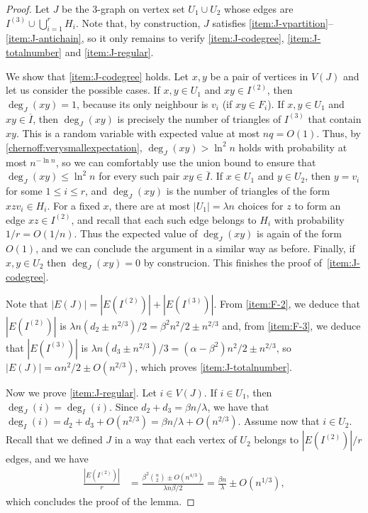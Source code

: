 \documentclass[a4paper, 11pt,reqno]{amsart}
\theoremstyle{plain}
\theoremstyle{definition}
\numberwithin{equation}{section}
\begin{document}
\begin{proof}
	Let $J$ be the $3$-graph on vertex set $U_1 \cup U_2$ whose edges
	are $I^{(3)} \cup \bigcup_{i=1}^r H_i$.  Note that, by construction,
	$J$ satisfies \ref{item:J-vpartition}--\ref{item:J-antichain}, 
	so it only remains to verify \ref{item:J-codegree},
	\ref{item:J-totalnumber} and \ref{item:J-regular}.
	
	We show that \ref{item:J-codegree} holds.  Let $x, y$ be a pair of
	vertices in $V(J)$ and let us consider the possible cases.  If $x, y
	\in U_1$ and $xy \in I^{(2)}$, then $\deg_{J}(xy) = 1$, because its only
	neighbour is $v_i$ (if $xy \in F_i$).  If $x, y \in U_1$ and $xy \in
	\overline{I}$, then $\deg_{J}(xy)$ is precisely the number of
	triangles of $I^{(3)}$ that contain $xy$. This is a random variable
	with expected value at most $nq = O(1)$.  Thus, by \ref{chernoff:verysmallexpectation}, $\deg_{J}(xy) > \ln^2 n$ holds with
	probability at most $n^{- \ln n}$, so we can comfortably use the
	union bound to ensure that $\deg_{J}(xy) \leq \ln^2 n$ for every
	such pair $xy \in \overline{I}$.  If $x \in U_1$ and $y \in U_2$,
	then $y = v_i$ for some $1 \leq i \leq r$, and $\deg_{J}(xy)$ is the
	number of triangles of the form $xzv_i \in H_i$.  For a fixed $x$,
	there are at most $|U_1| = \lambda n$ choices for $z$ to form an
	edge $xz \in I^{(2)}$, and recall that each such edge belongs to
	$H_i$ with probability $1/r = O(1/n)$.  Thus the expected value of
	$\deg_{J}(xy)$ is again of the form $O(1)$, and we can conclude the
	argument in a similar way as before. Finally, if $x, y \in U_2$ 
	then $\deg_J(xy) = 0$ by construcion.  This finishes the proof 
	of~\ref{item:J-codegree}.
	
	Note that $|E(J)| = |E(I^{(2)})|+|E(I^{(3)})|$.  From \ref{item:F-2}, we deduce  
	that $|E(I^{(2)})|$ is {$\lambda n (d_2 \pm n^{2/3})/2 = \beta^2 n^2 /2
	\pm n^{2/3}$} and, from \ref{item:F-3}, we deduce that $|E(I^{(3)})|$ is
	{$\lambda n (d_3 \pm n^{2/3})/3 = (\alpha - \beta^2) n^2 /2 \pm
	n^{2/3}$}, so $|E(J)| = \alpha n^2 /2 \pm O(n^{2/3})$, which proves
	\ref{item:J-totalnumber}.
	
	Now we prove \ref{item:J-regular}.
	Let $i \in V(J)$. If $i \in U_1$, then $\deg_J(i) = \deg_I(i)$.
	Since $d_2 + d_3 = \beta n/\lambda$, we have that $\deg_I(i) = d_2 + d_3 +
	O(n^{2/3}) = \beta n / \lambda + O(n^{2/3})$.
	Assume now that $i \in U_2$.
	Recall that we defined $J$ in a way that
	each vertex of $U_2$ belongs to $|E(I^{(2)})|/r$ edges, and we have
	\begin{align*}
		\frac{|E(I^{(2)})|}{r}
		& = \frac{\beta^2 \binom{n}{2} \pm O(n^{4/3})}{\lambda n \beta / 2}
		= \frac{\beta n}{\lambda} \pm O(n^{1/3}),
	\end{align*} 
	which concludes the proof of the lemma.
\end{proof}
\end{document}
